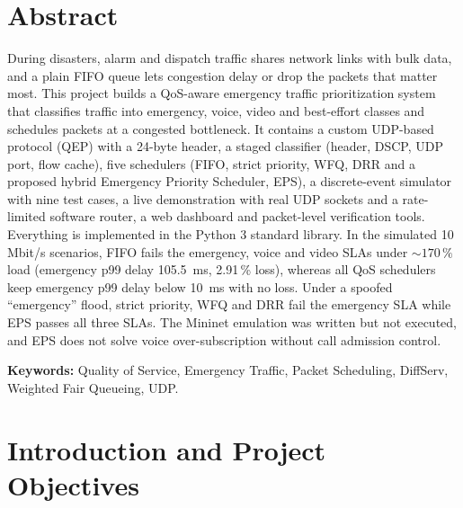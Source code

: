 \documentclass[12pt,a4paper]{article}
\begin{document}
\section*{Abstract}
During disasters, alarm and dispatch traffic shares network links with bulk data, and a plain FIFO
queue lets congestion delay or drop the packets that matter most. This project builds a
QoS-aware emergency traffic prioritization system that classifies traffic into emergency, voice,
video and best-effort classes and schedules packets at a congested bottleneck. It contains a custom
UDP-based protocol (QEP) with a 24-byte header, a staged classifier (header, DSCP, UDP port, flow
cache), five schedulers (FIFO, strict priority, WFQ, DRR and a proposed hybrid Emergency Priority
Scheduler, EPS), a discrete-event simulator with nine test cases, a live demonstration with real UDP
sockets and a rate-limited software router, a web dashboard and packet-level verification tools.
Everything is implemented in the Python 3 standard library. In the simulated 10 Mbit/s scenarios,
FIFO fails the emergency, voice and video SLAs under ${\sim}170\,\%$ load (emergency p99 delay
105.5~ms, 2.91\,\% loss), whereas all QoS schedulers keep emergency p99 delay below 10~ms with no loss.
Under a spoofed ``emergency'' flood, strict priority, WFQ and DRR fail the emergency SLA while EPS
passes all three SLAs. The Mininet emulation was written but not executed, and EPS does not solve
voice over-subscription without call admission control.

\textbf{Keywords:} Quality of Service, Emergency Traffic, Packet Scheduling, DiffServ, Weighted Fair Queueing, UDP.
\newpage

\tableofcontents
\newpage
\listoffigures
\newpage
\listoftables
\newpage

\setcounter{page}{1}

\section{Introduction and Project Objectives}
\end{document}
